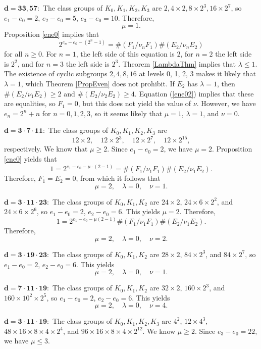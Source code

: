 \documentclass{amsart}
\begin{document}
\noindent
$\mathbf{d=33, 57:}$ The class groups of $K_0, K_1, K_2, K_3$ are $2, 4\times 2, 8\times 2^3, 16\times 2^7$, so
$e_1-e_0=2$, $e_2-e_0=5$, $e_3-e_0=10$. Therefore, 
$$\mu=1.$$
Proposition \ref{ene0} implies that
\begin{equation}\label{ene02}
2^{e_n-e_0-(2^n-1)} = \#(F_1/\nu_n F_1) \#(E_2/\nu_n E_2)
\end{equation}
for all $n\ge 0$. For $n=1$, the left side of this equation is $2$,  for $n=2$ the left side is $2^2$, and for $n=3$ the left side is $2^3$. 
Theorem \ref{LambdaThm} implies that $\lambda\le 1$. The existence of cyclic subgroups $2, 4, 8, 16$ at levels 0, 1, 2, 3
makes it likely that $\lambda=1$, which Theorem \ref{PropEven} does not prohibit.  If $E_2$ has $\lambda=1$, then $\#(E_2/\nu_1E_2)\ge 2$
and $\#(E_2/\nu_2E_2)\ge 4$. Equation (\ref{ene02}) implies that these are equalities, so $F_1=0$, but this does not
yield the value of $\nu$. However, we have $e_n=2^n+n$ for $n=0, 1, 2, 3$, so it seems likely that $\mu=1$, $\lambda=1$, and $\nu=0$.
\medskip

\noindent
{$\mathbf{d=3\cdot 7\cdot 11:}$} The class groups of $K_0, K_1, K_2, K_3$ are
$$
12\times 2, \quad 12\times 2^3, \quad 12\times 2^7, \quad 12 \times 2^{15},
$$
respectively. We know that $\mu\ge 2$. Since 
$e_1-e_0=2$, we have $\mu=2$. 
Proposition \ref{ene0} yields that
$$
1=2^{e_1-e_0-\mu\cdot (2-1)} = \#(F_1/\nu_1 F_1)\#(E_2/\nu_1 E_2).
$$
Therefore, $F_1=E_2=0$, from which it follows that
$$
\mu=2, \quad \lambda = 0, \quad \nu=1.
$$

\medskip
\noindent
{$\mathbf{d=3\cdot 11\cdot 23:}$} The class groups of $K_0, K_1, K_2$ are
$24\times 2$, $24\times 6\times 2^2$, and  $24\times 6\times 2^6$, so $e_1-e_0=2$, $e_2-e_0 = 6$.
This yields $\mu=2$. Therefore,
$$
1 = 2^{e_1-e_0-\mu(2-1)}  \#(F_1/\nu_1 F_1)\#(E_2/\nu_1 E_2).
$$
Therefore,
$$
\mu=2, \quad \lambda = 0, \quad \nu = 2.
$$

\medskip
\noindent
{$\mathbf{d=3\cdot 19\cdot 23:}$} The class groups of $K_0, K_1, K_2$ are
$28\times 2$, $84\times 2^3$, and  $84\times 2^7$, so $e_1-e_0 = 2$, $e_2-e_0=6$.
This yields
$$
\mu=2,\quad \lambda = 0,\quad \nu = 1.
$$

\medskip
\noindent
{$\mathbf{d=7\cdot 11 \cdot 19:}$} The class groups of $K_0, K_1, K_2$ are
$ 32 \times 2$, $160\times 2^3$,  and $160 \times 10^2 \times 2^5$, 
so $e_1-e_0= 2$,  $e_2-e_0 = 6$. This yields
$$
\mu = 2,\quad \lambda = 0,\quad \nu = 4.
$$


\medskip
\noindent
{$\mathbf{d=3\cdot 11\cdot 19:}$} The class groups of $K_0, K_1, K_2, K_3$ are
$4^2$, $12\times 4^3$, $48\times 16\times 8\times 4\times 2^4$, and
$96\times 16 \times 8\times 4 \times 2^{12}$.
We know $\mu \ge 2$.
Since $e_3-e_0= 22$, we have $\mu \le 3$.
\end{document}

